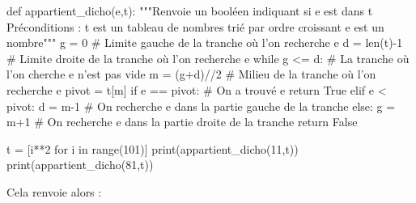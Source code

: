 \begin{pyverbatim}
def appartient_dicho(e,t):
    """Renvoie un booléen indiquant si e est dans t
       Préconditions : t est un tableau de nombres trié par ordre croissant
                       e est un nombre"""
    g = 0 # Limite gauche de la tranche où l'on recherche e
    d = len(t)-1 # Limite droite de la tranche où l'on recherche e
    while g <= d: # La tranche où l'on cherche e n'est pas vide
        m = (g+d)//2 # Milieu de la tranche où l'on recherche e
        pivot = t[m] 
        if e == pivot: # On a trouvé e
            return True
        elif e < pivot: 
            d = m-1 # On recherche e dans la partie gauche de la tranche
        else:
            g = m+1 # On recherche e dans la partie droite de la tranche
    return False
    
t = [i**2 for i in range(101)]
print(appartient_dicho(11,t))
print(appartient_dicho(81,t))
\end{pyverbatim}
Cela renvoie alors :
\begin{quote}
\end{quote}


